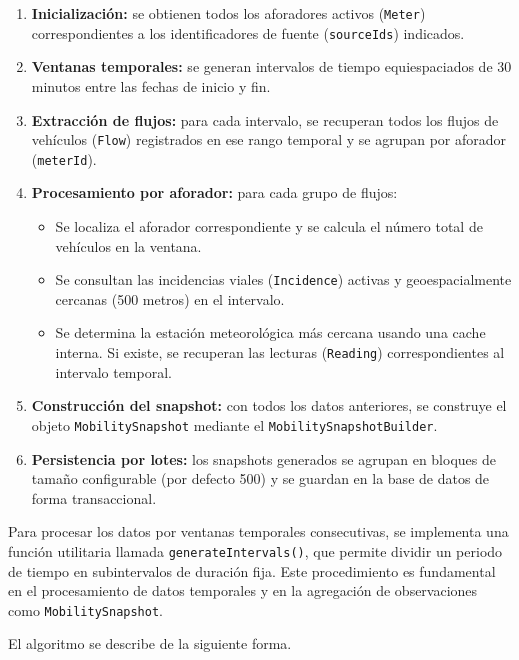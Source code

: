 \begin{enumerate}
	\item \textbf{Inicialización:} se obtienen todos los aforadores activos (\texttt{Meter}) correspondientes a los identificadores de fuente (\texttt{sourceIds}) indicados.
	\item \textbf{Ventanas temporales:} se generan intervalos de tiempo equiespaciados de 30 minutos entre las fechas de inicio y fin.
	\item \textbf{Extracción de flujos:} para cada intervalo, se recuperan todos los flujos de vehículos (\texttt{Flow}) registrados en ese rango temporal y se agrupan por aforador (\texttt{meterId}).
	\item \textbf{Procesamiento por aforador:} para cada grupo de flujos:
	\begin{itemize}
		\item Se localiza el aforador correspondiente y se calcula el número total de vehículos en la ventana.
		\item Se consultan las incidencias viales (\texttt{Incidence}) activas y geoespacialmente cercanas (500 metros) en el intervalo.
		\item Se determina la estación meteorológica más cercana usando una cache interna. Si existe, se recuperan las lecturas (\texttt{Reading}) correspondientes al intervalo temporal.
	\end{itemize}
	\item \textbf{Construcción del snapshot:} con todos los datos anteriores, se construye el objeto \texttt{MobilitySnapshot} mediante el \texttt{MobilitySnapshotBuilder}.
	\item \textbf{Persistencia por lotes:} los snapshots generados se agrupan en bloques de tamaño configurable (por defecto 500) y se guardan en la base de datos de forma transaccional.
\end{enumerate}

Para procesar los datos por ventanas temporales consecutivas, se implementa una función utilitaria llamada \texttt{generateIntervals()}, que permite dividir un periodo de tiempo en subintervalos de duración fija. Este procedimiento es fundamental en el procesamiento de datos temporales y en la agregación de observaciones como \texttt{MobilitySnapshot}.

El algoritmo se describe de la siguiente forma.

